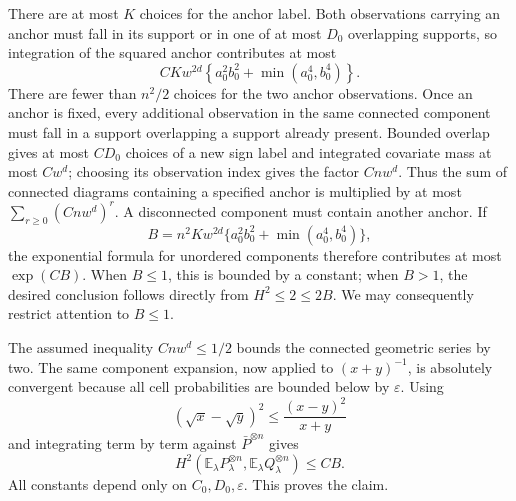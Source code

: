 There are at most \(K\) choices for the anchor label. Both observations carrying an anchor must fall in its support or in one of at most \(D_0\) overlapping supports, so integration of the squared anchor contributes at most
\[
CKw^{2d}\left\{a_0^2b_0^2+\min(a_0^4,b_0^4)\right\}.
\]
There are fewer than \(n^2/2\) choices for the two anchor observations. Once an anchor is fixed, every additional observation in the same connected component must fall in a support overlapping a support already present. Bounded overlap gives at most \(CD_0\) choices of a new sign label and integrated covariate mass at most \(Cw^d\); choosing its observation index gives the factor \(Cnw^d\). Thus the sum of connected diagrams containing a specified anchor is multiplied by at most \(\sum_{r\ge0}(Cnw^d)^r\). A disconnected component must contain another anchor. If
\[
B=n^2Kw^{2d}\{a_0^2b_0^2+\min(a_0^4,b_0^4)\},
\]
the exponential formula for unordered components therefore contributes at most \(\exp(CB)\). When \(B\le1\), this is bounded by a constant; when \(B>1\), the desired conclusion follows directly from \(H^2\le2\le2B\). We may consequently restrict attention to \(B\le1\).

The assumed inequality \(Cnw^d\le1/2\) bounds the connected geometric series by two. The same component expansion, now applied to \((x+y)^{-1}\), is absolutely convergent because all cell probabilities are bounded below by \(\varepsilon\). Using
\[
(\sqrt{x}-\sqrt{y})^2\le\frac{(x-y)^2}{x+y}
\]
and integrating term by term against \(\bar P^{\otimes n}\) gives
\[
H^2\!\left(\mathbb E_\lambda P_\lambda^{\otimes n},\mathbb E_\lambda Q_\lambda^{\otimes n}\right)
\le CB.
\]
All constants depend only on \(C_0,D_0,\varepsilon\). This proves the claim.